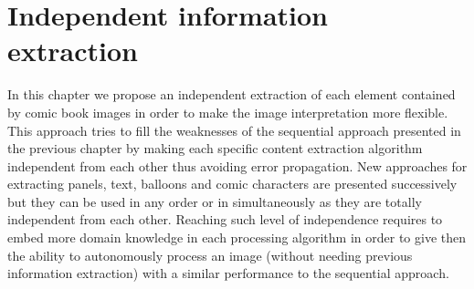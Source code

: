 \chapter{Independent information extraction}
\label{chap:independent}
\graphicspath{{./chapters/4-independent/figs/}}


In this chapter we propose an independent extraction of each element contained by comic book images in order to make the image interpretation more flexible.
This approach tries to fill the weaknesses of the sequential approach presented in the previous chapter by making each specific content extraction algorithm independent from each other thus avoiding error propagation.
New approaches for extracting panels, text, balloons and comic characters are presented successively but they can be used in any order or in simultaneously as they are totally independent from each other.
Reaching such level of independence requires to embed more domain knowledge in each processing algorithm in order to give then the ability to autonomously process an image (without needing previous information extraction) with a similar performance to the sequential approach.


